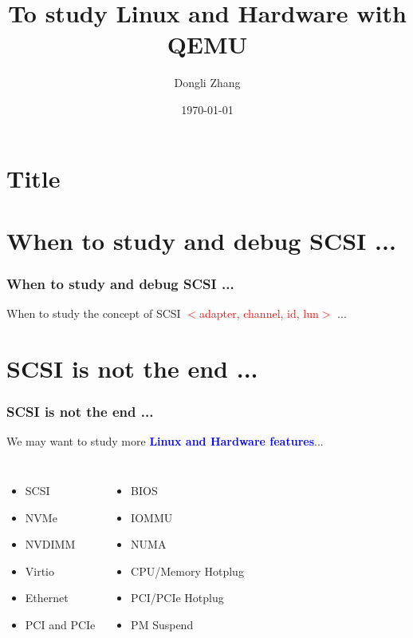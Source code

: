 \documentclass[aspectratio=169]{beamer}
\title[To study Linux and Hardware with QEMU]{To study Linux and Hardware with QEMU}
\author{Dongli Zhang}
\date{\today}
\begin{document}

\section{Title}
\begin{frame}
\titlepage
\end{frame}


\section{When to study and debug SCSI ...}
\begin{frame}
\frametitle{When to study and debug SCSI ...}
\Large When to study the concept of SCSI \textcolor{red}{$<$adapter, channel, id, lun$>$} ...
\begin{itemize}
\end{itemize}
\end{frame}


\section{SCSI is not the end ...}
\begin{frame}
\frametitle{SCSI is not the end ...}
{\LARGE We may want to study more \textbf{\textcolor{blue}{Linux and Hardware features}}...}
\begin{columns}[c]
{ \Large
\begin{itemize}
\item SCSI
\item NVMe
\item NVDIMM
\item Virtio
\item Ethernet
\item PCI and PCIe
\end{itemize}
}
{ \Large
\begin{itemize}
\item BIOS
\item IOMMU
\item NUMA
\item CPU/Memory Hotplug
\item PCI/PCIe Hotplug
\item PM Suspend
\end{itemize}
}
\end{columns}
\end{frame}
\end{document}
